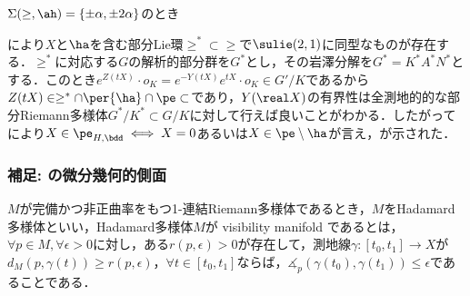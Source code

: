 \begin{npfwn}
\begin{case}


    
    
  \end{case}

  \begin{case}
    $\Sigma(\ge,\ah) = \{\pm\alpha,\pm 2\alpha \}$のとき

    により$X$と$\ha $を含む部分Lie環$\ge^* \subset \ge $で$\sulie(2,1) $に同型なものが存在する．$\ge^* $に対応する$G$の解析的部分群を$G^* $とし，その岩澤分解を$G^* = K^*A^*N^* $とする．このとき$e^{Z(t X)}\cdot o_K = e^{-Y(tX)}e^{tX}\cdot o_K\in G'/K $であるから$Z(tX)\in \ge^* \cap \per{\ha}\cap \pe\subset  $であり，$Y(\real X) $の有界性は全測地的的な部分Riemann多様体$G^*/K^* \subset G/K$に対して行えば良いことがわかる．したがってにより$X\in\pe_{H,\bdd}\iff X = 0 $あるいは$X\in \pe\setminus\ha $が言え，が示された．

    
    
  \end{case}  
\end{npfwn}


\subsubsection{補足: の微分幾何的側面}
\begin{defi}{\cite[Definition~1.3]{e72-1}}\label{def:visibility}

  $M$が完備かつ非正曲率をもつ1-連結Riemann多様体であるとき，$M$をHadamard多様体といい，Hadamard多様体$M$が visibility manifold であるとは，$\forall p\in M, \forall \epsilon > 0$に対し，ある$r(p,\epsilon) >0 $が存在して，測地線$\gamma\colon [t_0, t_1]\to X $が$d_{M}(p, \gamma(t))\geq r(p,\epsilon) $，$\forall t\in [t_0, t_1]$ならば，$\measuredangle_{p}(\gamma(t_0), \gamma(t_1)) \leq \epsilon $であることである．
\end{defi}

